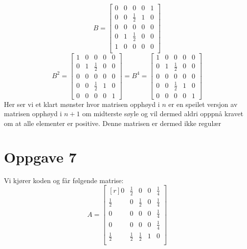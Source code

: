 \documentclass{article}
\begin{document}
\[
B =
\begin{bmatrix}
 0 & 0 & 0 & 0 & 1 \\
 0 & 0 & \frac{1}{2} & 1 & 0 \\
 0 & 0 & 0 & 0 & 0 \\
 0 & 1 & \frac{1}{2} & 0 & 0 \\
 1 & 0 & 0 & 0 & 0 \\
\end{bmatrix}
\]
\[
B^{2} = \begin{bmatrix}1 & 0 & 0 & 0 & 0\\0 & 1 & \frac{1}{2} & 0 & 0\\0 & 0 & 0 & 0 & 0\\0 & 0 & \frac{1}{2} & 1 & 0\\0 & 0 & 0 & 0 & 1\end{bmatrix} = 
B^{4} = \begin{bmatrix}1 & 0 & 0 & 0 & 0\\0 & 1 & \frac{1}{2} & 0 & 0\\0 & 0 & 0 & 0 & 0\\0 & 0 & \frac{1}{2} & 1 & 0\\0 & 0 & 0 & 0 & 1\end{bmatrix}
\]
Her ser vi et klart mønster hvor matrisen opphøyd i $ n $ er en speilet versjon av matrisen opphøyd i $ n+1 $ om midterste søyle og vil dermed aldri opppnå kravet om at alle elementer er positive. Denne matrisen er dermed ikke regulær

  
  
\section*{Oppgave 7}

Vi kjører koden og får følgende matrise:
\[
A=
\begin{bmatrix*}[r]
 0 & \frac{1}{2} & 0 & 0 & \frac{1}{4} \\[1.1em]
 \frac{1}{2} & 0 & \frac{1}{2} & 0 & \frac{1}{4} \\[1.1em]
 0 & 0 & 0 & 0 & \frac{1}{4} \\[1.1em]
 0 & 0 & 0 & 0 & \frac{1}{4} \\[1.1em]
 \frac{1}{2} & \frac{1}{2} & \frac{1}{2} & 1 & 0 \\
\end{bmatrix*}
\]
\end{document}
